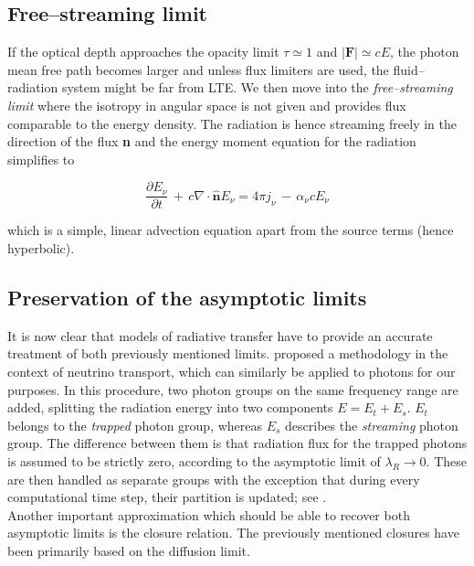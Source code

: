 \subsection{Free--streaming limit}
\label{subsec:Free_streaming_limit}

If the optical depth approaches the opacity limit $\tau \simeq 1$ and $\vert\textbf{F}\vert \simeq cE$, the photon mean free path becomes larger and unless flux limiters are used, the fluid--radiation system might be far from LTE.
We then move into the \textit{free--streaming limit} where the isotropy in angular space is not given and provides flux comparable to the energy density.
The radiation is hence streaming freely in the direction of the flux \textbf{n} and the energy moment equation for the radiation simplifies to

\begin{equation}
  \frac{\partial E_{\nu}}{\partial t} \,+\, c\nabla\cdot\hat{\textbf{n}}E_{\nu} = 4\pi j_{\nu}\,-\, \alpha_{\nu}cE_{\nu}
\end{equation}

which is a simple, linear advection equation apart from the source terms (hence hyperbolic).

\subsection{Preservation of the asymptotic limits}
\label{subsec:Asymptotic_limits}

It is now clear that models of radiative transfer have to provide an accurate treatment of both previously mentioned limits.
\citet{streaming_vs_trapped} proposed a methodology in the context of neutrino transport, which can similarly be applied to photons for our purposes.
In this procedure, two photon groups on the same frequency range are added, splitting the radiation energy into two components $E=E_{t}+E_{s}$.
$E_{t}$ belongs to the \textit{trapped} photon group, whereas $E_{s}$ describes the \textit{streaming} photon group.
The difference between them is that radiation flux for the trapped photons is assumed to be strictly zero, according to the asymptotic limit of $\lambda_{R}\to 0$.
These are then handled as separate groups with the exception that during every computational time step, their partition is updated; see \citet{Joki_IR}.
\\[6pt]
%
Another important approximation which should be able to recover both asymptotic limits is the closure relation.
The previously mentioned closures have been primarily based on the diffusion limit.

